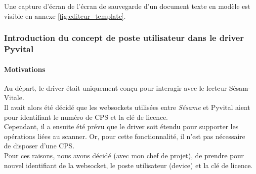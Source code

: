 Une capture d'écran de l'écran de sauvegarde d'un document texte en modèle est visible en annexe \ref{fig:editeur_template}.

		
\subsubsection{Introduction du concept de poste utilisateur dans le driver Pyvital}
\paragraph*{Motivations\\}
Au départ, le driver était uniquement conçu pour interagir avec le lecteur Sésam-Vitale.\\ Il avait alors été décidé que les websockets utilisées entre \textit{Sésame} et Pyvital aient pour identifiant le numéro de \gls{CPS} et la clé de licence.\\
Cependant, il a ensuite été prévu que le driver soit étendu pour supporter les opérations liées au scanner. Or, pour cette fonctionnalité, il n'est pas nécessaire de disposer d'une CPS.\\
Pour ces raisons, nous avons décidé (avec mon chef de projet), de prendre pour nouvel identifiant de la websocket, le poste utilisateur (device) et la clé de licence. 

